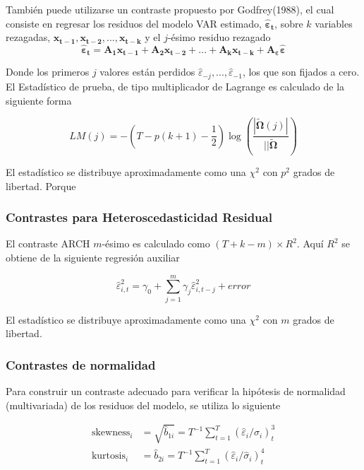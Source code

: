 \documentclass[12pt, twoside]{book}\usepackage[]{graphicx}\usepackage[]{color}
\let\bold\boldsymbol
\numberwithin{equation}{section}
\numberwithin{theorem}{section}
\numberwithin{teorema}{section}
\numberwithin{defi}{section}
\numberwithin{prop}{section}
\numberwithin{defi}{section}
\theoremstyle{plain}
\begin{document}
{{También puede utilizarse un contraste propuesto por Godfrey(1988),  el cual consiste en regresar los residuos del modelo VAR estimado, $\boldsymbol{\hat{\varepsilon}_{t}}$, sobre $k$ variables rezagadas, $\bold{x_{t-1}, x_{t-2}, ...,x_{t-k}}$ y el $j$-ésimo residuo rezagado
\begin{equation}
\boldsymbol{\hat{\varepsilon}_{t}}=\bold{A_{1}x_{t-1}+A_{2}x_{t-2}+...+A_{k}x_{t-k}+A_{\varepsilon}}\boldsymbol{\hat{\varepsilon}}
\end{equation}

Donde los primeros $j$ valores están perdidos $\hat{\varepsilon}_{-j},...,\hat{\varepsilon}_{-1}$, los que son fijados a cero. El Estadístico de prueba, de tipo multiplicador de Lagrange es calculado de la siguiente forma 

\begin{equation}
LM(j) = -(T-p(k+1)-\frac{1}{2})\log \left(\frac{|\boldsymbol{\tilde{\Omega}}(j)|}{||\boldsymbol{\tilde{\Omega}}}\right)
\end{equation}

El estadístico se distribuye aproximadamente como una $\chi^{2}$ con $p^{2}$ grados de libertad. Porque 

\subsubsection{Contrastes para Heteroscedasticidad Residual}

El contraste ARCH $m$-ésimo es calculado como $(T+k-m)\times R^{2}$. Aquí $R^{2}$ se obtiene de la siguiente regresión auxiliar

\begin{equation}
\hat{\varepsilon}^{2}_{i,t} = \gamma_{0}+\sum_{j=1}^{m}\gamma_{j}\hat{\varepsilon}_{i,t-j}^{2}+error
\end{equation}

El estadístico se distribuye aproximadamente como una $\chi^{2}$ con $m$ grados de libertad. 

\subsubsection{Contrastes de normalidad}

Para construir un contraste adecuado para verificar la hipótesis de normalidad (multivariada) de los residuos del modelo, se utiliza lo siguiente

\begin{align}
\text{skewness}_{i} & = \sqrt{\hat{b}_{1i}} = T^{-1}\sum_{t=1}^{T}(\hat{\varepsilon}_{i}/\hat{\sigma}_{i})^{3}_{t} \\ 
\text{kurtosis}_{i} & = \hat{b}_{2i} = T^{-1}\sum_{t=1}^{T}(\hat{\varepsilon}_{i}/\hat{\sigma}_{i})^{4}_{t} 
\end{align}

}}
\end{document}

